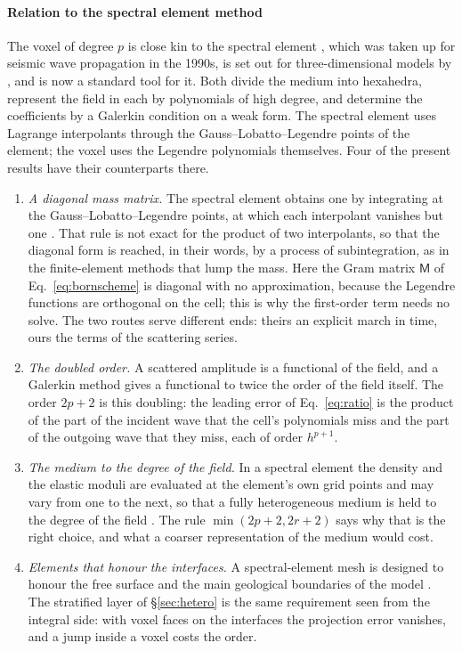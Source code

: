 \documentclass[preprint,review,12pt]{elsarticle}
\begin{document}
\paragraph{Relation to the spectral element method} The voxel of degree $p$ is close kin to the
spectral element \citep{Patera1984}, which was taken up for seismic wave propagation in the 1990s, is
set out for three-dimensional models by \citet{Komatitsch1999}, and is now a standard tool for it. Both divide the medium into hexahedra,
represent the field in each by polynomials of high degree, and determine the coefficients by a Galerkin
condition on a weak form. The spectral element uses Lagrange interpolants through the
Gauss--Lobatto--Legendre points of the element; the voxel uses the Legendre polynomials themselves.
Four of the present results have their counterparts there.
\begin{enumerate}
\item \emph{A diagonal mass matrix.} The spectral element obtains one by integrating at the
Gauss--Lobatto--Legendre points, at which each interpolant vanishes but one \citep{Komatitsch1999}.
That rule is not exact for the product of two interpolants, so that the diagonal form is reached, in
their words, by a process of subintegration, as in the finite-element methods that lump the mass. Here
the Gram matrix $\mathsf{M}$ of Eq.~\eqref{eq:bornscheme} is diagonal with no approximation, because
the Legendre functions are orthogonal on the cell; this is why the first-order term needs no solve. The
two routes serve different ends: theirs an explicit march in time, ours the terms of the scattering
series.
\item \emph{The doubled order.} A scattered amplitude is a functional of the field, and a Galerkin
method gives a functional to twice the order of the field itself. The order $2p+2$ is this doubling: the
leading error of Eq.~\eqref{eq:ratio} is the product of the part of the incident wave that the cell's
polynomials miss and the part of the outgoing wave that they miss, each of order $h^{p+1}$.
\item \emph{The medium to the degree of the field.} In a spectral element the density and the elastic
moduli are evaluated at the element's own grid points and may vary from one to the next, so that a
fully heterogeneous medium is held to the degree of the field \citep{Komatitsch1999}. The rule
$\min(2p+2,2r+2)$ says why that is the right choice, and what a coarser representation of the medium
would cost.
\item \emph{Elements that honour the interfaces.} A spectral-element mesh is designed to honour the
free surface and the main geological boundaries of the model \citep{Komatitsch1999}. The stratified
layer of \S\ref{sec:hetero} is the same requirement seen from the integral side: with voxel faces on
the interfaces the projection error vanishes, and a jump inside a voxel costs the order.
\end{enumerate}
\end{document}
